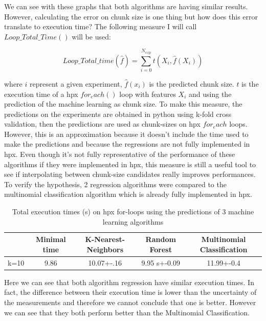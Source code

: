 We can see with these graphs that both algorithms are having similar results. However, calculating the error on chunk size is one thing but how does this error translate to execution time? The following measure I will call $Loop\_Total\_Time()$ will be used:

$$Loop\_Total\_time(\hat{f})=\sum_{i=0}^{N_{exp}} t(X_i,\hat{f}(X_i))$$

where $i$ represent a given experiment, $\hat{f}(x_i)$ is the predicted chunk size. $t$ is the execution time of a hpx $for_each()$ loop with features $X_i$ and using the prediction of the machine learning as chunk size. To make this measure, the predictions on the experiments are obtained in python using k-fold cross validation, then the predictions are used as chunk-sizes on hpx $for_each$ loops. However, this is an approximation because it doesn't include the time used to make the predictions and because the regressions are not fully implemented in hpx. Even though it's not fully representative of the performance of these algorithms if they were implemented in hpx, this measure is still a useful tool to see if interpolating between chunk-size candidates really improves performances. To verify the hypothesis, 2 regression algorithms were compared to the multinomial classification algorithm which is already fully implemented in hpx. 

\begin{table}[h]
	\centering
	\caption{Total execution times (s) on hpx for-loops using the predictions of 3 machine learning algorithms }
	\label{my-label}
	\begin{tabular}{|c|c|c|c|c|}
		\hline
		& Minimal time &K-Nearest-Neighbors & Random Forest &Multinomial Classification\\ \hline
		k=10 & 9.86
		&10.07+-.16  & 9.95 s+-0.09 & 11.99+-0.4\\ \hline
	\end{tabular}
\end{table}

Here we can see that both algorithm regression have similar execution times. In fact, the difference between their execution time is lower than the uncertainty of the measurements and therefore we cannot conclude that one is better. However we can see that they both perform better than the Multinomial Classification.

